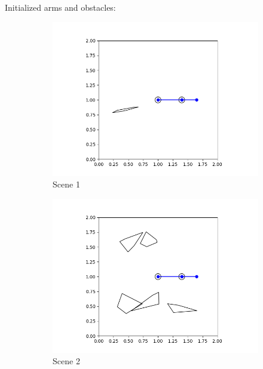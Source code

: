\documentclass{article}
\begin{document}
Initialized arms and obstacles:
\begin{figure}[h!]
    \centering
    \begin{subfigure}{0.45\textwidth}
        \includegraphics[width=\textwidth]{polygon_scene1.png}
        \caption{Scene 1}
    \end{subfigure}
    \hfill
    \begin{subfigure}{0.45\textwidth}
        \includegraphics[width=\textwidth]{polygon_scene2.png}
        \caption{Scene 2}
    \end{subfigure}
    \\
    \begin{subfigure}{0.45\textwidth}

\end{subfigure}
\end{figure}
\end{document}
